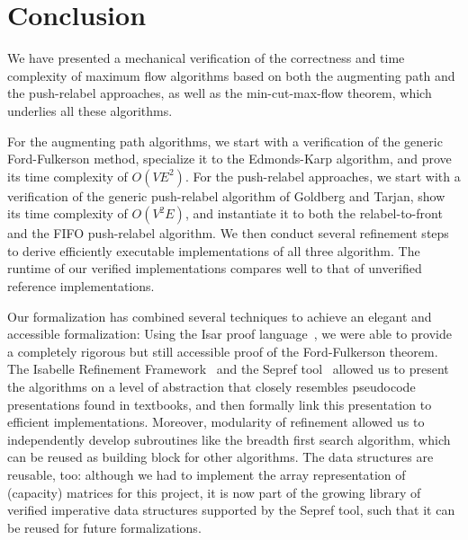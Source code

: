 \documentclass[smallcondensed]{svjour3}     %
\begin{document}
    

\section{Conclusion}\label{sec:concl}
  We have presented a mechanical verification of the correctness and time complexity of maximum flow algorithms based on both 
  the augmenting path and the push-relabel approaches, as well as the min-cut-max-flow theorem, which underlies all these algorithms.
  
  For the augmenting path algorithms, we start with a verification of the generic Ford-Fulkerson method, 
  specialize it to the Edmonds-Karp algorithm, and prove its time complexity of $O(VE^2)$.
  For the push-relabel approaches, we start with a verification of the generic push-relabel algorithm of Goldberg and Tarjan, show its time complexity of $O(V^2E)$, and
  instantiate it to both the relabel-to-front and the FIFO push-relabel algorithm.
  We then conduct several refinement steps to derive efficiently executable implementations of all three algorithm.
  The runtime of our verified implementations compares well to that of unverified reference implementations.
  
  Our formalization has combined several techniques to achieve an elegant and accessible formalization: 
  Using the Isar proof language~\cite{Wenzel99}, we were able to provide a completely rigorous but 
  still accessible proof of the Ford-Fulkerson theorem. The Isabelle Refinement Framework~\cite{LaTu12,La12} and the Sepref tool~\cite{La15,La16}
  allowed us to present the algorithms on a level 
  of abstraction that closely resembles pseudocode presentations found in textbooks, and then formally link this presentation to efficient
  implementations. Moreover, modularity of refinement allowed us to independently develop subroutines like the breadth first search algorithm, 
  which can be reused as building block for other algorithms.
  The data structures are reusable, too: although we had to implement the array representation of (capacity) matrices for this project, it is now part of the 
  growing library of verified imperative data structures supported by the Sepref tool, such that it can be reused for future formalizations.
  
\end{document}
